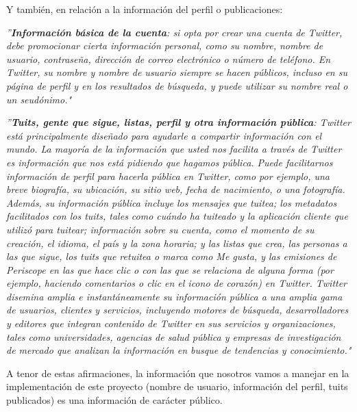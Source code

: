\noindent Y también, en relación a la información del perfil o publicaciones:

\leftskip=1cm
\rightskip=1cm
{\em ''{\bf Información básica de la cuenta}: si opta por crear una cuenta de Twitter, debe promocionar cierta información personal, 
como su nombre, nombre de usuario, contraseña, dirección de correo electrónico o número de teléfono. 
En Twitter, su nombre y nombre de usuario siempre se hacen públicos, incluso en su página de perfil y en los resultados de búsqueda, 
y puede utilizar su nombre real o un seudónimo."}

\leftskip=1cm
\rightskip=1cm
{\em ''{\bf Tuits, gente que sigue, listas, perfil y otra información pública}: Twitter está principalmente diseñado para ayudarle a 
compartir información con el mundo. La mayoría de la información que usted nos facilita a través de Twitter es información 
que nos está pidiendo que hagamos pública. Puede facilitarnos información de perfil para hacerla pública en Twitter, como por 
ejemplo, una breve biografía, su ubicación, su sitio web, fecha de nacimiento, o una fotografía. Además, su información pública 
incluye los mensajes que tuitea; los metadatos facilitados con los tuits, tales como cuándo ha tuiteado y la aplicación cliente 
que utilizó para tuitear; información sobre su cuenta, como el momento de su creación, el idioma, el país y la zona horaria; y las 
listas que crea, las personas a las que sigue, los tuits que retuitea o marca como Me gusta, y las emisiones de Periscope en las que 
hace clic o con las que se relaciona de alguna forma (por ejemplo, haciendo comentarios o clic en el icono de corazón) en Twitter. 
Twitter disemina amplia e instantáneamente su información pública a una amplia gama de usuarios, clientes y servicios, incluyendo 
motores de búsqueda, desarrolladores y editores que integran contenido de Twitter en sus servicios y organizaciones, tales como universidades, 
agencias de salud pública y empresas de investigación de mercado que analizan la información en busque de tendencias y conocimiento."}

\leftskip=0pt \rightskip=0pt



A tenor de estas afirmaciones, la información que nosotros vamos a manejar en la implementación de este proyecto
(nombre de usuario, información del perfil, tuits publicados)
es una información de carácter público. 

